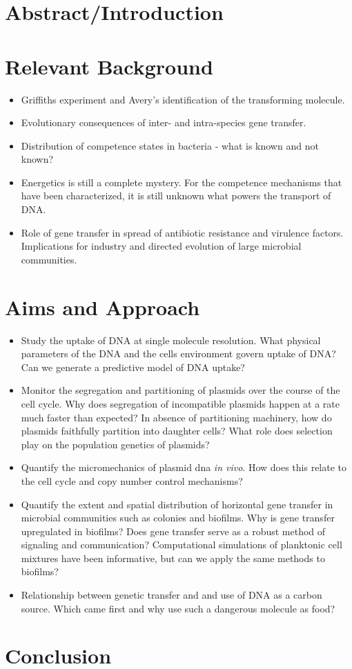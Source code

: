 


\section*{Abstract/Introduction}

\section*{Relevant Background}
\begin{itemize}
	\item Griffiths experiment and Avery's identification of the transforming molecule. 
	\item Evolutionary consequences of inter- and intra-species gene transfer. 
	\item Distribution of competence states in bacteria - what is known and not known?
	\item Energetics is still a complete mystery. For the competence mechanisms that have been characterized, it is
		still unknown what powers the transport of DNA.
	\item Role of gene transfer in spread of antibiotic resistance and virulence factors. Implications for industry
		and directed evolution of large microbial communities.
\end{itemize}


\section*{Aims and Approach}
\begin{itemize}
	\item Study the uptake of DNA at single molecule resolution. What physical parameters of the DNA and the cells
		environment govern uptake of DNA? Can we generate a predictive model of DNA uptake?
	\item Monitor the segregation and partitioning of plasmids over the course of the cell cycle. Why does
		segregation of incompatible plasmids happen at a rate much faster than expected? In absence of
		partitioning machinery, how do plasmids faithfully partition into daughter cells? What role does
		selection play on the population genetics of plasmids? 
	\item Quantify the micromechanics of plasmid dna \textit{in vivo}. How does this relate to the cell cycle and
		copy number control mechanisms?
	\item Quantify the extent and spatial distribution of horizontal gene transfer in microbial communities such as
		colonies and biofilms. Why is gene transfer upregulated in biofilms? Does gene transfer serve as a
		robust method of signaling and communication? Computational simulations of planktonic cell mixtures have
		been informative, but can we apply the same methods to biofilms?
	\item Relationship between genetic transfer and and use of DNA as a carbon source. Which came first and why use
		such a dangerous molecule as food?
\end{itemize}

\section*{Conclusion}




